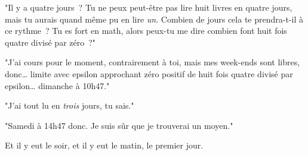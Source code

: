 "Il y a quatre jours~? Tu ne peux peut-être pas lire huit livres en quatre jours, mais tu aurais quand même pu en lire \emph{un}. Combien de jours cela te prendra-t-il à ce rythme~? Tu es fort en math, alors peux-tu me dire combien font huit fois quatre divisé par zéro~?"

"J'ai cours pour le moment, contrairement à toi, mais mes week-ends sont libres, donc… limite avec epsilon approchant zéro positif de huit fois quatre divisé par epsilon… dimanche à 10h47."

"J'ai tout lu en \emph{trois} jours, tu sais."

"Samedi à 14h47 donc. Je suis sûr que je trouverai un moyen."

Et il y eut le soir, et il y eut le matin, le premier jour.

